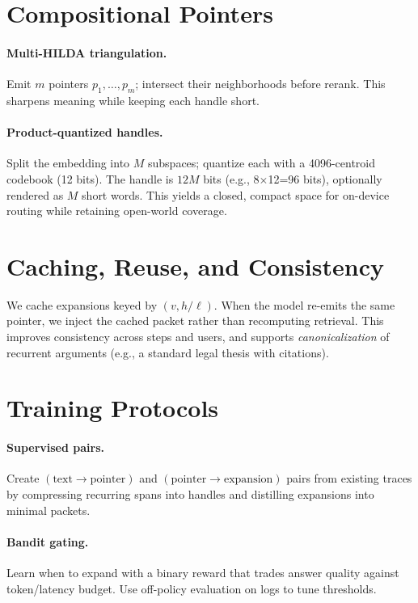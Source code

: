 \documentclass[11pt]{article}
\newcommand{\hilda}{\textsc{HILDA}}
\begin{document}
\section{Compositional Pointers}
\paragraph{Multi-\hilda{} triangulation.} Emit $m$ pointers $p_1,\dots,p_m$; intersect their neighborhoods before rerank. This sharpens meaning while keeping each handle short.

\paragraph{Product-quantized handles.} Split the embedding into $M$ subspaces; quantize each with a 4096-centroid codebook (12 bits). The handle is $12M$ bits (e.g., 8$\times$12=96 bits), optionally rendered as $M$ short words. This yields a closed, compact space for on-device routing while retaining open-world coverage.

\section{Caching, Reuse, and Consistency}
We cache expansions keyed by $(v,h{/}\ell)$. When the model re-emits the same pointer, we inject the cached packet rather than recomputing retrieval. This improves consistency across steps and users, and supports \emph{canonicalization} of recurrent arguments (e.g., a standard legal thesis with citations).

\section{Training Protocols}
\paragraph{Supervised pairs.} Create $(\text{text} \to \text{pointer})$ and $(\text{pointer} \to \text{expansion})$ pairs from existing traces by compressing recurring spans into handles and distilling expansions into minimal packets.

\paragraph{Bandit gating.} Learn when to expand with a binary reward that trades answer quality against token/latency budget. Use off-policy evaluation on logs to tune thresholds.
\end{document}
